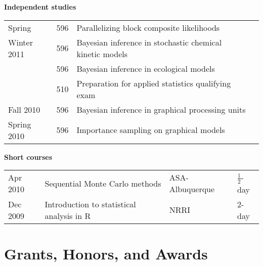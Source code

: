 \documentclass[overlapped,line]{res}
\begin{document}
\begin{resume}
{\bf Independent studies}

\begin{tabular}{llll}
Spring & 596 & Parallelizing block composite likelihoods \\
Winter 2011 & 596 & Bayesian inference in stochastic chemical kinetic models \\
& 596 & Bayesian inference in ecological models \\
& 510 & Preparation for applied statistics qualifying exam \\
Fall 2010 & 596 & Bayesian inference in graphical processing units \\
Spring 2010 & 596 & Importance sampling on graphical models
\end{tabular}

{\bf Short courses}

\begin{tabular}{llll}
Apr 2010 & Sequential Monte Carlo methods & ASA-Albuquerque & $\frac{1}{2}$-day \\
Dec 2009 & Introduction to statistical analysis in R & NRRI & 2-day
\end{tabular}


\section{\bf Grants, Honors, and Awards}

\end{resume}
\end{document}
